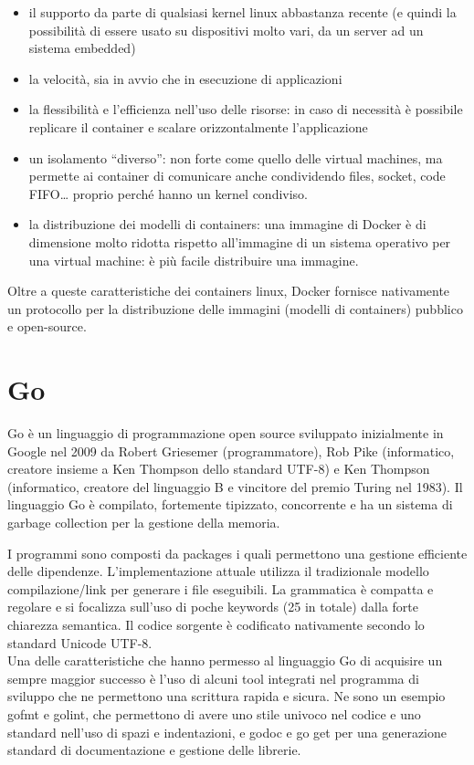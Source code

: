 \begin{itemize}
\item il supporto da parte di qualsiasi kernel linux abbastanza recente (e quindi la possibilità di essere usato su dispositivi molto vari, da un server ad un sistema embedded)
\item la velocità, sia in avvio che in esecuzione di applicazioni \cite{containerVSvm-paper}
\item la flessibilità e l'efficienza nell'uso delle risorse: in caso di necessità è possibile replicare il container e scalare orizzontalmente l'applicazione
\item un isolamento \textquotedblleft{}diverso\textquotedblright{}: non forte come quello delle virtual machines, ma permette ai container di comunicare anche condividendo files, socket, code FIFO\ldots{} proprio perché hanno un kernel condiviso. \cite{linuxContainers-paper}
\item la distribuzione dei modelli di containers: una immagine di Docker è di dimensione molto ridotta rispetto all'immagine di un sistema operativo per una virtual machine: è più facile distribuire una immagine.
\end{itemize}

Oltre a queste caratteristiche dei containers linux, Docker fornisce nativamente
un protocollo per la distribuzione delle immagini (modelli di containers)
pubblico e open-source.



\section{Go}
Go è un linguaggio di programmazione open source sviluppato inizialmente in
Google nel 2009 da Robert Griesemer (programmatore), Rob Pike (informatico, creatore
insieme a Ken Thompson dello standard UTF-8) e Ken Thompson (informatico, creatore
del linguaggio B e vincitore del premio Turing nel 1983).
Il linguaggio Go è compilato, fortemente tipizzato, concorrente e ha un
sistema di garbage collection per la gestione della memoria\cite{go-website}.

I programmi sono composti da packages i quali permettono una gestione efficiente
delle dipendenze. L'implementazione attuale utilizza il tradizionale modello
compilazione/link per generare i file eseguibili.
La grammatica è compatta e regolare e si focalizza sull'uso di poche
keywords (25 in totale) dalla forte chiarezza semantica. \cite{goSpec-website}
Il codice sorgente è codificato nativamente secondo lo standard Unicode UTF-8.
\\[2\baselineskip]
Una delle caratteristiche che hanno permesso al linguaggio Go di acquisire
un sempre maggior successo \cite{programmingLanguagesIndex-website} è l'uso di alcuni tool integrati nel programma
di sviluppo che ne permettono una scrittura rapida e sicura.
Ne sono un esempio gofmt e golint, che permettono di avere uno stile univoco nel
codice e uno standard nell'uso di spazi e indentazioni, e godoc e go get per una
generazione standard di documentazione e gestione delle librerie.


